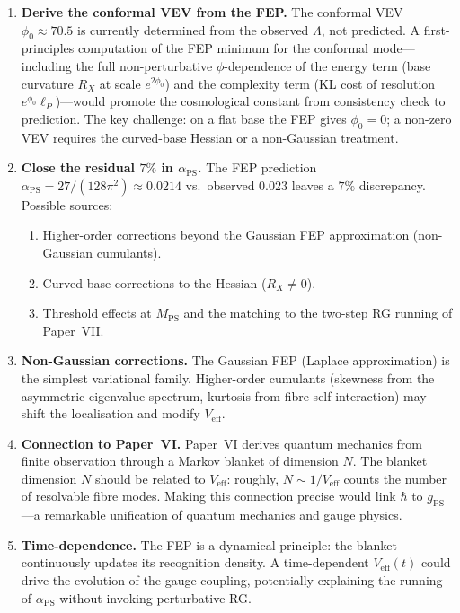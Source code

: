 \documentclass[12pt, a4paper]{article}
\theoremstyle{definition}
\theoremstyle{remark}
\newcommand{\Veff}{V_{\mathrm{eff}}}
\newcommand{\MPS}{M_{\mathrm{PS}}}
\newcommand{\gPS}{g_{\mathrm{PS}}}
\newcommand{\aPS}{\alpha_{\mathrm{PS}}}
\begin{document}
\begin{enumerate}
\item \textbf{Derive the conformal VEV from the FEP.}
The conformal VEV $\phi_0 \approx 70.5$ is currently determined from the observed $\Lambda$, not predicted.
A first-principles computation of the FEP minimum for the conformal mode---including the full non-perturbative $\phi$-dependence of the energy term (base curvature $R_X$ at scale $e^{2\phi_0}$) and the complexity term (KL cost of resolution $e^{\phi_0} \ell_P$)---would promote the cosmological constant from consistency check to prediction.
The key challenge: on a flat base the FEP gives $\phi_0 = 0$; a non-zero VEV requires the curved-base Hessian or a non-Gaussian treatment.

\item \textbf{Close the residual $7\%$ in $\aPS$.}
The FEP prediction $\aPS = 27/(128\pi^2) \approx 0.0214$ vs.\ observed $0.023$ leaves a $7\%$ discrepancy.
Possible sources:
\begin{enumerate}[nosep]
\item Higher-order corrections beyond the Gaussian FEP approximation (non-Gaussian cumulants).
\item Curved-base corrections to the Hessian ($R_X \neq 0$).
\item Threshold effects at $\MPS$ and the matching to the two-step RG running of Paper~VII.
\end{enumerate}

\item \textbf{Non-Gaussian corrections.}
The Gaussian FEP (Laplace approximation) is the simplest variational family.
Higher-order cumulants (skewness from the asymmetric eigenvalue spectrum, kurtosis from fibre self-interaction) may shift the localisation and modify $\Veff$.

\item \textbf{Connection to Paper~VI.}
Paper~VI derives quantum mechanics from finite observation through a Markov blanket of dimension $N$.
The blanket dimension $N$ should be related to $\Veff$: roughly, $N \sim 1/\Veff$ counts the number of resolvable fibre modes.
Making this connection precise would link $\hbar$ to $\gPS$---a remarkable unification of quantum mechanics and gauge physics.

\item \textbf{Time-dependence.}
The FEP is a dynamical principle: the blanket continuously updates its recognition density.
A time-dependent $\Veff(t)$ could drive the evolution of the gauge coupling, potentially explaining the running of $\aPS$ without invoking perturbative RG.
\end{enumerate}
\end{document}
